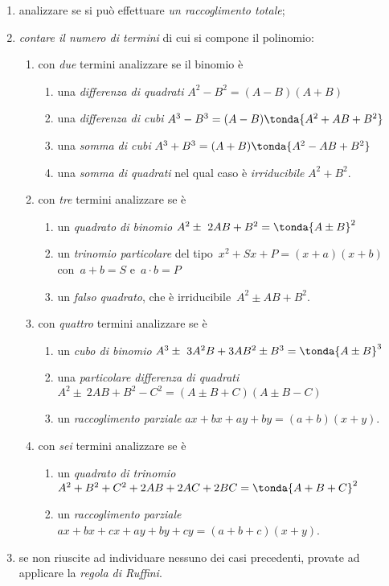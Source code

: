 \begin{enumerate}
\item analizzare se si può effettuare \emph{un raccoglimento totale};
\item \emph{contare il numero di termini} di cui si compone il polinomio:
 \begin{enumerate}
  \item con \emph{due} termini analizzare se il binomio è
   \begin{enumerate}
	\item una \emph{differenza di quadrati} 
	 \(A^{2}-B^{2}=(A-B)(A+B)\)
	\item una \emph{differenza di cubi}
	 \(A^{3}-B^{3}=(A-B)\tonda{A^{2}+AB+B^{2}}\)
	\item una \emph{somma di cubi} 
	 \(A^{3}+B^{3}=(A+B)\tonda{A^{2}-AB+B^{2}}\)
	\item una \emph{somma di quadrati} nel qual caso è \emph{irriducibile} 
	 \(A^{2}+B^{2}\).
   \end{enumerate}
  \item con \emph{tre} termini analizzare se è
   \begin{enumerate}
	\item un \emph{quadrato di binomio} 
	 \(A^{2}\pm~2AB+B^{2}=\tonda{A\pm B}^{2}\)
	\item un \emph{trinomio particolare} del tipo~\(x^{2}+Sx+P=(x+a)(x+b)\) 
	 con~\(a+b=S\) e~\(a\cdot b=P\)
	\item un \emph{falso quadrato}, che è irriducibile~\(A^{2}\pm AB+B^{2}\).
   \end{enumerate}
  \item con \emph{quattro} termini analizzare se è
   \begin{enumerate}
	\item un \emph{cubo di binomio} 
	 \(A^{3}\pm~3A^{2}B+3AB^{2}\pm B^{3}=\tonda{A\pm B}^{3}\)
	\item una \emph{particolare differenza di quadrati}
	 \subitem \(A^{2}\pm~2AB+B^{2}-C^{2}=(A\pm B+C)(A\pm B-C)\)
	\item un \emph{raccoglimento parziale} \(ax+bx+ay+by=(a+b)(x+y)\).
   \end{enumerate}
  \item con \emph{sei} termini analizzare se è
   \begin{enumerate}
	\item un \emph{quadrato di trinomio} 
	 \(A^{2}+B^{2}+C^{2}+2AB+2{AC}+2{BC}=\tonda{A+B+C}^{2}\)
	\item un \emph{raccoglimento parziale}
	 \subitem \(ax+{bx}+{cx}+{ay}+{by}+{cy}=(a+b+c)(x+y)\).
   \end{enumerate}
  \end{enumerate}
 \item se non riuscite ad individuare nessuno dei casi precedenti, provate ad 
  applicare la \emph{regola di Ruffini}.
\end{enumerate}


